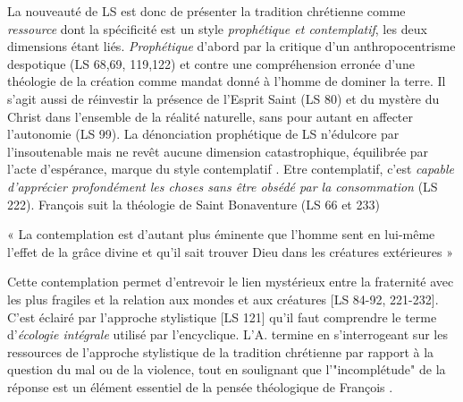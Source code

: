 La nouveauté de LS est donc de présenter la tradition chrétienne comme \textit{ressource} dont la spécificité est un style \textit{prophétique et contemplatif}, les deux dimensions étant liés. \textit{Prophétique} d'abord par la critique d'un anthropocentrisme despotique (LS 68,69, 119,122) et contre une compréhension erronée d'une théologie de la création comme mandat donné à l'homme de dominer la terre.  Il s'agit aussi de réinvestir la présence de l'Esprit Saint (LS 80) et du mystère du Christ dans l'ensemble de la réalité naturelle, sans pour autant en affecter l'autonomie (LS 99). La dénonciation prophétique de LS n'édulcore par l'insoutenable mais ne revêt aucune dimension catastrophique, équilibrée par l'acte d'espérance, marque du style contemplatif \cite[p. 192]{theobald_courage_2021}.  \label{theob:apocalytique} Etre contemplatif, c'est \textit{capable d'apprécier profondément les choses sans être obsédé par la consommation} (LS 222). François suit la théologie de Saint Bonaventure (LS 66 et 233) 
\begin{singlequote}
    « La contemplation est d'autant plus éminente que l'homme sent en lui-même l'effet de la grâce divine et qu'il sait trouver Dieu dans les créatures extérieures »
\end{singlequote}
Cette contemplation permet d'entrevoir le lien mystérieux entre la fraternité avec les plus fragiles et la relation aux mondes et aux créatures [LS 84-92, 221-232]. C'est éclairé par l'approche stylistique [LS 121] qu'il faut comprendre le terme d'\textit{écologie intégrale} utilisé par l'encyclique.
L'A. termine en s'interrogeant sur les ressources de l'approche stylistique de la tradition chrétienne par rapport à la question du mal ou de la violence, tout en soulignant que l'"incomplétude" de la réponse est un élément essentiel de la pensée théologique de François \cite{francois_premiere_2013}.







